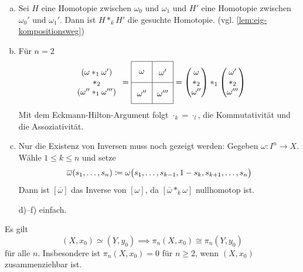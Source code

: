 \begin{beweis}
	\begin{enumerate}[a)]
		\item Sei $H$ eine Homotopie zwischen $\omega_0$ und $\omega_1$ und $H'$ eine Homotopie zwischen $\omega_0'$ und $\omega_1'$. 
		Dann ist $H *_k H'$ die gesuchte Homotopie. \hfill (vgl. \cref{lem:eig-kompositionsweg})
		\item Für $n=2$
		\[
			\begin{array}{c}
				(\omega *_1 \omega') \\
				*_2 \\
				(\omega'' *_1 \omega''')
			\end{array}
			 = 
			\vcenter{\hbox{\begin{tikzpicture}[scale=0.9]
				\draw (0,0) grid (2,2);
				\node at (0.5,0.5){$\omega''$};
				\node at (0.5,1.5){$\omega$};
				\node at (1.5,0.5){$\omega'''$};
				\node at (1.5,1.5){$\omega'$};
			\end{tikzpicture}}}
			 = \begin{pmatrix}
			 	\omega \\
				*_2 \\
				\omega''
			 \end{pmatrix} *_1
			 \begin{pmatrix}
			 	\omega' \\
				*_2 \\
				\omega'''
			 \end{pmatrix}
		\]
		Mit dem Eckmann-Hilton-Argument folgt $\cdot_k = \cdot_l$, die Kommutativität und die Assoziativität.
		\item Nur die Existenz von Inversen muss noch gezeigt werden:
		Gegeben $\omega \colon I^n \to X$. Wähle $1 \le k \le n$ und setze
		\[
			\overline{\omega} (s_1, \ldots , s_n) \coloneqq \omega  \enbrace[\big]{s_1, \ldots , s_{k-1} ,1- s_k , s_{k+1}, \ldots , s_n} 
		\]
		Dann ist $[\overline{\omega}]$ das Inverse von $[\omega]$, da $[\overline{\omega} *_k \omega ]$ nullhomotop ist.
		\item[d)--f)] einfach. \qedhere
	\end{enumerate}
\end{beweis}

\begin{korollar}[{name=[Die Homotopiegruppen punktiert homöomorpher Räume stimmen überein]}]
	Es gilt 
	\[
		(X,x_0) \simeq (Y,y_0) \implies \pi_n(X,x_0) \cong \pi_n(Y,y_0)
	\]
	für alle $n$. Insbesondere ist $\pi_n(X,x_0) = 0$ für $n \ge 2$, wenn  $(X,x_0)$ zusammenziehbar ist.
\end{korollar}

